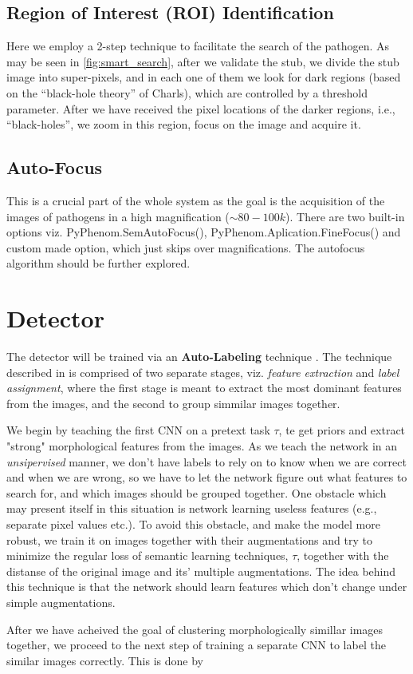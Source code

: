 \subsection{Region of Interest (ROI) Identification}
Here we employ a 2-step technique to facilitate the search of the pathogen. As may be seen in \cref{fig:smart_search}, after we validate the stub, we divide the stub image into super-pixels, and in each one of them we look for dark regions (based on the “black-hole theory” of Charls), which are controlled by a threshold parameter. After we have received the pixel locations of the darker regions, i.e., “black-holes”, we zoom in this region, focus on the image and acquire it.

\subsection{Auto-Focus}
This is a crucial part of the whole system as the goal is the acquisition of the images of pathogens in a high magnification ($\sim80-100k$). There are two built-in options viz. PyPhenom.SemAutoFocus(), PyPhenom.Aplication.FineFocus() and custom made option, which just skips over magnifications. The autofocus algorithm should be further explored.

\section{Detector}
The detector will be trained via an \textbf{Auto-Labeling} technique \cite{van2020scan}. The technique described in \cite{van2020scan} is comprised of two separate stages, viz. \emph{feature extraction} and \emph{label assignment}, where the first stage is meant to extract the most dominant features from the images, and the second to group simmilar images together.

We begin by teaching the first CNN on a pretext task $\tau$, te get priors and extract "strong" morphological features from the images. As we teach the network in an \emph{unsipervised} manner, we don't have labels to rely on to know when we are correct and when we are wrong, so we have to let the network figure out what features to search for, and which images should be grouped together. One obstacle which may present itself in this situation is network learning useless features (e.g., separate pixel values etc.). To avoid this obstacle, and make the model more robust, we train it on images together with their augmentations and try to minimize the regular loss of semantic learning techniques, $\tau$, together with the distanse of the original image and its' multiple augmentations. The idea behind this technique is that the network should learn features which don't change under simple augmentations.

After we have acheived the goal of clustering morphologically simillar images together, we proceed to the next step of training a separate CNN to label the similar images correctly. This is done by
